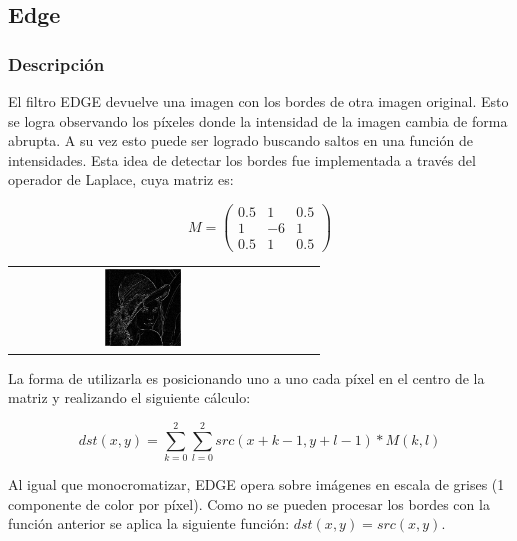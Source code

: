 \subsection{Edge}

\subsubsection{Descripción}

\begin{multicols}{2}
El filtro EDGE devuelve una imagen con los bordes de otra imagen original. Esto se logra observando los píxeles donde la intensidad de la imagen cambia de forma abrupta. A su vez esto puede ser logrado buscando saltos en una función de intensidades. Esta idea de detectar los bordes fue implementada a través del operador de Laplace, cuya matriz es: 

$$ M = \left(
\begin{matrix}
    0.5 & 1 & 0.5 \\
    1 & -6 & 1 \\
    0.5 & 1 & 0.5
\end{matrix}
\right)$$

\begin{center}
	\begin{tabular}{cccc}
		\includegraphics[width=0.3\textwidth]{imagenes/lenaEDGA.jpg} \\
		\end{tabular}
	\end{center}
\end{multicols}

La forma de utilizarla es posicionando uno a uno cada píxel en el centro de la matriz y realizando el siguiente cálculo: 

$$dst(x, y) = \sum_{k = 0}^2 \sum_{l = 0}^2 src(x + k - 1, y + l - 1) * M(k, l)$$

Al igual que monocromatizar, EDGE opera sobre imágenes en escala de grises (1 componente de color por píxel). Como no se pueden procesar los bordes con la función anterior se aplica la siguiente función: $dst(x, y) = src(x,y)$.

